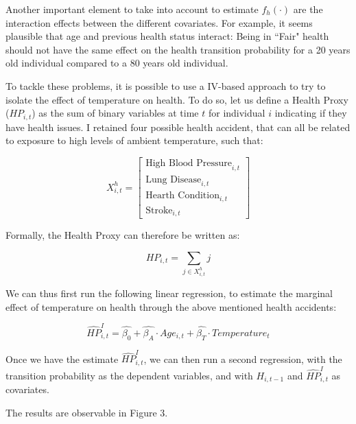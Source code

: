 \documentclass{article}
\begin{document}
Another important element to take into account to estimate 
$f_{h}(\cdot)$ are the interaction 
effects between the different covariates.
For example, it seems plausible that age and previous health status interact:
Being in ``Fair"
health should not have the same effect on the health transition probability 
for a 20 years old individual compared to a 80 years old individual. 

To tackle these problems, it is possible to use a 
IV-based approach to try to isolate the effect of
temperature on health. 
To do so, let us define a Health Proxy ($HP_{i,t}$) as 
the sum of binary variables at time $t$ for individual 
$i$ indicating if they have health issues.
I retained four possible health accident, 
that can all be related to exposure to 
high levels of ambient temperature, such that: 

$$
    X_{i,t}^{h} =
    \begin{bmatrix}
        \text{High Blood Pressure}_{i,t} \\
        \text{Lung Disease}_{i,t} \\ 
        \text{Hearth Condition}_{i,t} \\ 
        \text{Stroke}_{i,t}
    \end{bmatrix}
$$

Formally, the Health Proxy can therefore be written as:

\begin{equation}
    HP_{i,t} = \sum_{j\in X^{h}_{i,t}} j
\end{equation}

We can thus first run the following linear regression,
to estimate the marginal effect of temperature on health
through the above mentioned health accidents:

\begin{equation}
    \widehat{HP}_{i,t}^{I} =  \widehat{\beta_0} +
    \widehat{\beta_{A}} \cdot Age_{i,t} +
    \widehat{\beta_{T}} \cdot Temperature_{t}
\end{equation}

Once we have the estimate $\widehat{HP}_{i,t}^{I}$, we can
then run a second regression, with the transition probability 
as the dependent variables, and with $H_{i,t-1}$ and 
$\widehat{HP}_{i,t}^{I}$ as covariates.

The results are observable in Figure 3.
\end{document}
